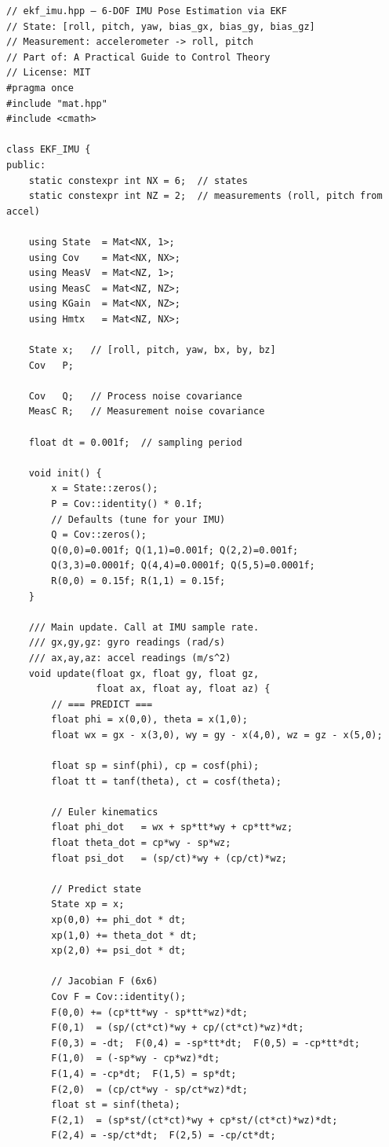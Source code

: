 \begin{verbatim}
// ekf_imu.hpp — 6-DOF IMU Pose Estimation via EKF
// State: [roll, pitch, yaw, bias_gx, bias_gy, bias_gz]
// Measurement: accelerometer -> roll, pitch
// Part of: A Practical Guide to Control Theory
// License: MIT
#pragma once
#include "mat.hpp"
#include <cmath>

class EKF_IMU {
public:
    static constexpr int NX = 6;  // states
    static constexpr int NZ = 2;  // measurements (roll, pitch from accel)

    using State  = Mat<NX, 1>;
    using Cov    = Mat<NX, NX>;
    using MeasV  = Mat<NZ, 1>;
    using MeasC  = Mat<NZ, NZ>;
    using KGain  = Mat<NX, NZ>;
    using Hmtx   = Mat<NZ, NX>;

    State x;   // [roll, pitch, yaw, bx, by, bz]
    Cov   P;

    Cov   Q;   // Process noise covariance
    MeasC R;   // Measurement noise covariance

    float dt = 0.001f;  // sampling period

    void init() {
        x = State::zeros();
        P = Cov::identity() * 0.1f;
        // Defaults (tune for your IMU)
        Q = Cov::zeros();
        Q(0,0)=0.001f; Q(1,1)=0.001f; Q(2,2)=0.001f;
        Q(3,3)=0.0001f; Q(4,4)=0.0001f; Q(5,5)=0.0001f;
        R(0,0) = 0.15f; R(1,1) = 0.15f;
    }

    /// Main update. Call at IMU sample rate.
    /// gx,gy,gz: gyro readings (rad/s)
    /// ax,ay,az: accel readings (m/s^2)
    void update(float gx, float gy, float gz,
                float ax, float ay, float az) {
        // === PREDICT ===
        float phi = x(0,0), theta = x(1,0);
        float wx = gx - x(3,0), wy = gy - x(4,0), wz = gz - x(5,0);

        float sp = sinf(phi), cp = cosf(phi);
        float tt = tanf(theta), ct = cosf(theta);

        // Euler kinematics
        float phi_dot   = wx + sp*tt*wy + cp*tt*wz;
        float theta_dot = cp*wy - sp*wz;
        float psi_dot   = (sp/ct)*wy + (cp/ct)*wz;

        // Predict state
        State xp = x;
        xp(0,0) += phi_dot * dt;
        xp(1,0) += theta_dot * dt;
        xp(2,0) += psi_dot * dt;

        // Jacobian F (6x6)
        Cov F = Cov::identity();
        F(0,0) += (cp*tt*wy - sp*tt*wz)*dt;
        F(0,1)  = (sp/(ct*ct)*wy + cp/(ct*ct)*wz)*dt;
        F(0,3) = -dt;  F(0,4) = -sp*tt*dt;  F(0,5) = -cp*tt*dt;
        F(1,0)  = (-sp*wy - cp*wz)*dt;
        F(1,4) = -cp*dt;  F(1,5) = sp*dt;
        F(2,0)  = (cp/ct*wy - sp/ct*wz)*dt;
        float st = sinf(theta);
        F(2,1)  = (sp*st/(ct*ct)*wy + cp*st/(ct*ct)*wz)*dt;
        F(2,4) = -sp/ct*dt;  F(2,5) = -cp/ct*dt;


\end{verbatim}
